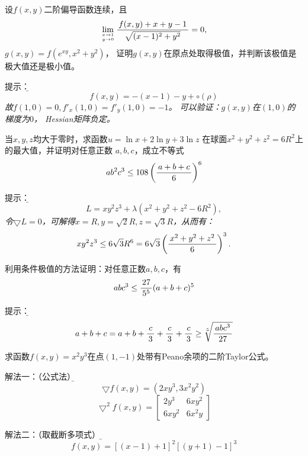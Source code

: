 \begin{frame}
	\linespread{2}
	设$f(x,y)$二阶偏导函数连续，且
	$$\lim\limits_{x\to 1\atop y\to 0}\displaystyle\frac{\,{f(x,y)+x+y-1}\,}{\,{\sqrt{(x-1)^2+y^2}}\,}=0,$$
	$g(x,y)=f(e^{xy},x^2+y^2)$，
	证明$g(x,y)$在原点处取得极值，并判断该极值是极大值还是极小值。
	
	\pause\alert{提示：}{\it\b  
	$$f(x,y)=-(x-1)-y+\circ(\rho)$$
	故$f(1,0)=0,f'_x(1,0)=f'_y(1,0)=-1$。
	\pause 可以验证：$g(x,y)$在$(1,0)$的梯度为$0$，
	Hessian矩阵负定。
	}
\end{frame}

\begin{frame}
	\linespread{1.2}
	当$x,y,z$均大于零时，求函数$u=\ln x+2\ln y+3\ln z$
	在球面$x^2+y^2+z^2=6R^2$上的最大值，并证明对任意正数
	$a,b,c$，成立不等式
	$$ab^2c^3\leq 108\left(\displaystyle\frac{\,{a+b+c}\,}{\,{6}\,}\right)^6$$
	
	\pause\alert{提示：}{\it\b  
	$$L=xy^2z^3+\lambda(x^2+y^2+z^2-6R^2),$$
	令$\bigtriangledown L=0$，可解得$x=R,y=\sqrt2 R,z=\sqrt3 R$，从而有：
	$$xy^2z^3\leq 6\sqrt 3R^6=6\sqrt 3\left(\displaystyle\frac{\,{x^2+y^2+z^2}\,}{\,{6}\,}\right)^3.$$
	}
\end{frame}

\begin{frame}
	\linespread{1.2}
	利用条件极值的方法证明：对任意正数$a,b,c$，有
	$$abc^3\leq\displaystyle\frac{\,{27}\,}{\,{5^5}\,}(a+b+c)^5$$
	
	\pause\alert{提示：}{\it\b  
	$$a+b+c=a+b+\displaystyle\frac{\,{c}\,}{\,{3}\,}+\displaystyle\frac{\,{c}\,}{\,{3}\,}+\displaystyle\frac{\,{c}\,}{\,{3}\,}\geq\sqrt[5]{\displaystyle\frac{\,{abc^3}\,}{\,{27}\,}}$$
	}
\end{frame}

\begin{frame}
	\linespread{1.2}
	求函数$f(x,y)=x^2y^3$在点$(1,-1)$处带有Peano余项的二阶Taylor公式。
	
	\pause\alert{解法一：（公式法）}{\it\b  
	$$\bigtriangledown f(x,y)=(2xy^3,3x^2y^2)$$
	$$
	\bigtriangledown^2 f(x,y)=
	\left[\begin{array}{cc}
	2y^3 & 6xy^2\\ 6xy^2 & 6x^2y
	\end{array}\right]$$
	}
	
	\pause
	\alert{解法二：（取截断多项式）}
	{\it\b
	$$f(x,y)=[(x-1)+1]^2[(y+1)-1]^3$$
	}
\end{frame}
